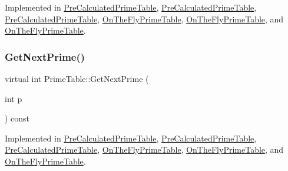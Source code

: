 Implemented in \mbox{\hyperlink{class_pre_calculated_prime_table_a0b99de0a790db9f0cc2b3cd4b527fd5a}{Pre\+Calculated\+Prime\+Table}}, \mbox{\hyperlink{class_pre_calculated_prime_table_a0b99de0a790db9f0cc2b3cd4b527fd5a}{Pre\+Calculated\+Prime\+Table}}, \mbox{\hyperlink{class_pre_calculated_prime_table_a0ff10b1fe13df7e56b8d7ed9f41d3998}{Pre\+Calculated\+Prime\+Table}}, \mbox{\hyperlink{class_on_the_fly_prime_table_a0f6f934f318407a812098e67584b60bf}{On\+The\+Fly\+Prime\+Table}}, \mbox{\hyperlink{class_on_the_fly_prime_table_a0f6f934f318407a812098e67584b60bf}{On\+The\+Fly\+Prime\+Table}}, and \mbox{\hyperlink{class_on_the_fly_prime_table_a5a4644fedd95d33136723f33b9302bfc}{On\+The\+Fly\+Prime\+Table}}.

\mbox{\label{class_prime_table_ae537c939f56617d8937d57bbbae3ab30}} 
\subsubsection{\texorpdfstring{GetNextPrime()}{GetNextPrime()}\hspace{0.1cm}{\footnotesize\ttfamily [3/3]}}
{\footnotesize\ttfamily virtual int Prime\+Table\+::\+Get\+Next\+Prime (\begin{DoxyParamCaption}\item[{int}]{p }\end{DoxyParamCaption}) const\hspace{0.3cm}{\ttfamily [pure virtual]}}



Implemented in \mbox{\hyperlink{class_pre_calculated_prime_table_a0b99de0a790db9f0cc2b3cd4b527fd5a}{Pre\+Calculated\+Prime\+Table}}, \mbox{\hyperlink{class_pre_calculated_prime_table_a0b99de0a790db9f0cc2b3cd4b527fd5a}{Pre\+Calculated\+Prime\+Table}}, \mbox{\hyperlink{class_pre_calculated_prime_table_a0ff10b1fe13df7e56b8d7ed9f41d3998}{Pre\+Calculated\+Prime\+Table}}, \mbox{\hyperlink{class_on_the_fly_prime_table_a0f6f934f318407a812098e67584b60bf}{On\+The\+Fly\+Prime\+Table}}, \mbox{\hyperlink{class_on_the_fly_prime_table_a0f6f934f318407a812098e67584b60bf}{On\+The\+Fly\+Prime\+Table}}, and \mbox{\hyperlink{class_on_the_fly_prime_table_a5a4644fedd95d33136723f33b9302bfc}{On\+The\+Fly\+Prime\+Table}}.

\mbox{\label{class_prime_table_a2ab9243364ded0c51541f641b2df362a}} 
